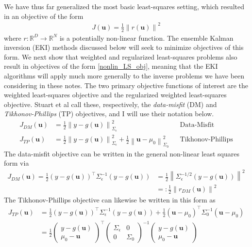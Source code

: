 \documentclass[12pt]{article}
\newcommand{\bpar}{\mathbf{u}} %
\newcommand*{\norm}[1]{\left\lVert#1\right\rVert}
\newcommand{\R}{\mathbb{R}}
\begin{document}
We have thus far generalized the most basic least-squares setting, which resulted in an objective of the form
\begin{align}
J(\bpar) = \frac{1}{2} \norm{r(\bpar)}^2 \label{nonlin_LS_obj}
\end{align}
where $r: \R^D \to \R^N$ is a potentially non-linear function. The ensemble Kalman inversion (EKI) methods discussed below will seek to minimize objectives of this form. 
We next show that weighted and regularized least-squares problems also result in objectives of the form \ref{nonlin_LS_obj}, meaning that the EKI algorithms will apply much more 
generally to the inverse problems we have been considering in these notes. The two primary objective functions of interest are the weighted least-squares objective and the regularized 
weighted least-squares objective. Stuart et al call these, respectively, the \textit{data-misfit} (DM) and \textit{Tikhonov-Phillips} (TP) objectives, and I will use their notation below. 
\begin{align}
J_{DM}(\bpar) &= \frac{1}{2} \norm{y - g(\bpar)}^2_{\Sigma_{\epsilon}} && \text{Data-Misfit} \label{DM_objective} \\
J_{TP}(\bpar) &= \frac{1}{2} \norm{y - g(\bpar)}^2_{\Sigma_{\epsilon}} + \frac{1}{2} \norm{\bpar - \mu_0}^2_{\Sigma_0} && \text{Tikhonov-Phillips} \label{TP_objective}
\end{align}
The data-misfit objective can be written in the general non-linear least squares form via
\begin{align*}
J_{DM}(\bpar) = \frac{1}{2} (y - g(\bpar))^\top \Sigma^{-1}_{\epsilon} (y - g(\bpar)) &= \frac{1}{2} \norm{\Sigma_{\epsilon}^{-1/2}(y - g(\bpar))}^2 \\
																						&=: \frac{1}{2} \norm{r_{DM}(\bpar)}^2
\end{align*}
The Tikhonov-Phillips objective can likewise be written in this form as
\begin{align*}
J_{TP}(\bpar) &= \frac{1}{2} (y - g(\bpar))^\top \Sigma^{-1}_{\epsilon} (y - g(\bpar)) + \frac{1}{2} (\bpar - \mu_0)^\top \Sigma^{-1}_0 (\bpar - \mu_0) \\
		       &= \frac{1}{2} \begin{pmatrix} y - g(\bpar) \\ \mu_0 - \bpar \end{pmatrix}^\top \begin{pmatrix} \Sigma_{\epsilon} & 0 \\ 0 & \Sigma_0 \end{pmatrix}^{-1} \begin{pmatrix} y - g(\bpar) \\ \mu_0 - \bpar \end{pmatrix}
\end{align*}
\end{document}
